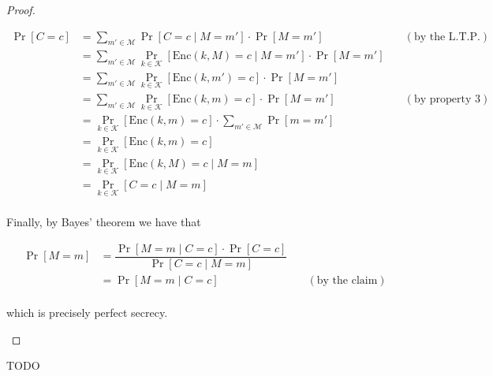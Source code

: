 \documentclass[a4paper, 12pt]{report}
\begin{document}
\begin{proof}
\begin{itemize}
{			      \begin{equation*}
				      \begin{alignedat}{2}
					      \Pr[C = c] & = \sum_{m' \in \mathcal M}{\Pr[C = c \mid M = m'] \cdot \Pr[M = m']}                                     & \quad (\mbox{by the L.T.P.}) \\
					                 & = \sum_{m' \in \mathcal M}{\Pr_{k \in \mathcal K}[\mathrm{Enc}(k, M) = c \mid M = m'] \cdot \Pr[M = m']} &                              \\
					                 & = \sum_{m' \in \mathcal M}{\Pr_{k \in \mathcal K}[\mathrm{Enc}(k, m') = c] \cdot \Pr[M = m']}            &                              \\
					                 & = \sum_{m' \in \mathcal M}{\Pr_{k \in \mathcal K}[\mathrm{Enc}(k, m) = c] \cdot \Pr[M = m']}             & \quad (\mbox{by property 3}) \\
					                 & = \Pr_{k \in \mathcal K}[\mathrm{Enc}(k, m) = c] \cdot \sum_{m' \in \mathcal M}{\Pr[m = m']}             &                              \\
					                 & = \Pr_{k \in \mathcal K}[\mathrm{Enc}(k, m) = c]                                                         &                              \\
					                 & = \Pr_{k \in \mathcal K}[\mathrm{Enc}(k, M) = c \mid M = m]                                              &                              \\
					                 & = \Pr_{k \in \mathcal K}[C = c \mid M = m]                                                               &                              \\
				      \end{alignedat}
			      \end{equation*}
		      }

		      Finally, by Bayes' theorem we have that

		      \begin{equation*}
			      \begin{alignedat}{2}
				      \Pr[M = m] & = \dfrac{\Pr[M = m \mid C = c] \cdot \Pr[C = c]}{\Pr[C = c \mid M = m]} &                             \\
				                 & = \Pr[M = m \mid C = c]                                                 & \quad (\mbox{by the claim}) \\
			      \end{alignedat}
		      \end{equation*}

		      which is precisely perfect secrecy.
	\end{itemize}
\end{proof}

TODO 

\end{document}
